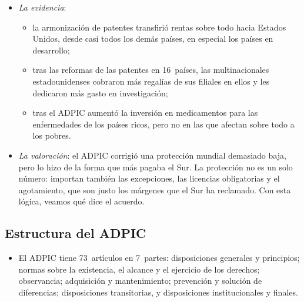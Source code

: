 \documentclass[11pt]{article}
\begin{document}
\begin{itemize}
\begin{itemize}
  \item si la tecnología llega al Sur por la inversión de las multinacionales y no por imitación, más protección atrae más inversión\nocite{Lai1998International};
  \item más protección no siempre es más innovación: un monopolio más largo puede frenar a los innovadores siguientes, que construyen sobre las ideas anteriores\nocite{Scotchmer1991Standing}.
  \end{itemize}
\item \emph{La evidencia}:
  \begin{itemize}
  \item la armonización de patentes transfirió rentas sobre todo hacia Estados Unidos, desde casi todos los demás países, en especial los países en desarrollo\nocite{McCalman2001Reaping};
  \item tras las reformas de las patentes en 16~países, las multinacionales estadounidenses cobraron más regalías de sus filiales en ellos y les dedicaron más gasto en investigación\nocite{BranstetterFismanFoley2006Stronger};
  \item tras el ADPIC aumentó la inversión en medicamentos para las enfermedades de los países ricos, pero no en las que afectan sobre todo a los pobres\nocite{KyleMcGahan2012Investments}.
  \end{itemize}
\item \emph{La valoración}: el ADPIC corrigió una protección mundial demasiado baja, pero lo hizo de la forma que más pagaba el Sur. La protección no es un solo número: importan también las excepciones, las licencias obligatorias y el agotamiento, que son justo los márgenes que el Sur ha reclamado. Con esta lógica, veamos qué dice el acuerdo.
\end{itemize}

\subsection{Estructura del ADPIC}\label{sec:adpic-estructura}

\begin{itemize}
\item El ADPIC tiene 73~artículos en 7~partes\nocite{OMC1994ADPIC}: disposiciones generales y principios; normas sobre la existencia, el alcance y el ejercicio de los derechos; observancia; adquisición y mantenimiento; prevención y solución de diferencias; disposiciones transitorias, y disposiciones institucionales y finales.
\end{itemize}
\end{document}
